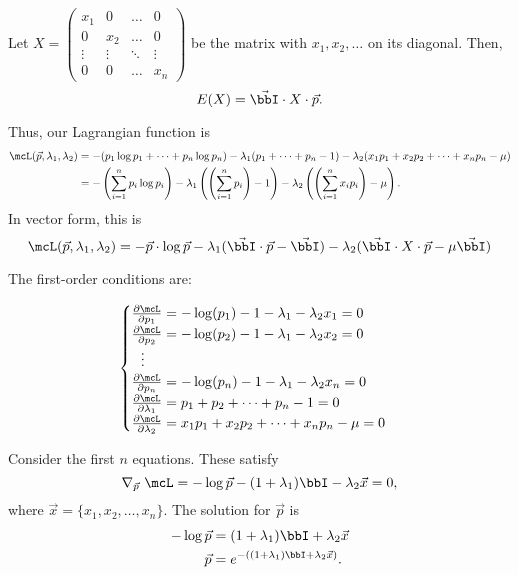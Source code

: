 \documentclass[a4paper, 12pt,oneside,openany]{book}
\begin{document}
Let $X=\begin{pmatrix} x_1 & 0  & \dots & 0 \\ 0 & x_2 & \dots & 0 \\ \vdots & \vdots & \ddots & \vdots \\ 0 & 0 & \dots & x_n \end{pmatrix}$ be the matrix with $x_1, x_2, \dots$ on its diagonal. Then, $$E(X)= \vec{\bbI} \cdot X \cdot \vec{p}.$$

Thus, our Lagrangian function is \begin{align*} \mcL(\vec{p}, \lambda_1, \lambda_2) &= -(p_1\log p_1+\dots + p_n \log p_n) - \lambda_1(p_1+\dots+p_n-1) - \lambda_2(x_1p_1 + x_2p_2 + \dots + x_np_n-\mu)\\ &= -\left(\sum\limits_{i=1}^n p_i \log p_i\right) - \lambda_1\left(\left(\sum\limits_{i=1}^n p_i\right)-1\right) - \lambda_2\left(\left(\sum\limits_{i=1}^n x_ip_i\right)-\mu\right). \end{align*} In vector form, this is $$\mcL(\vec{p}, \lambda_1, \lambda_2) = -\vec{p} \cdot \log\vec{p} - \lambda_1 (\vec{\bbI}\cdot \vec{p} -\vec{\bbI}) - \lambda_2 (\vec{\bbI} \cdot X \cdot \vec{p}-\mu\vec{\bbI})$$ 

The first-order conditions are:

$$\begin{cases}
	\frac{\partial \mcL}{\partial p_1} = -\log(p_1)-1-\lambda_1-\lambda_2x_1=0 \\
	\frac{\partial \mcL}{\partial p_2} = -\log(p_2)-1-\lambda_1-\lambda_2x_2=0 \\
	\ \ \vdots \\
	\frac{\partial \mcL}{\partial p_n} = -\log(p_n)-1-\lambda_1-\lambda_2x_n=0 \\
	\frac{\partial \mcL}{\partial \lambda_1} = p_1+p_2+\dots+p_n-1=0 \\
	\frac{\partial \mcL}{\partial \lambda_2} = x_1p_1+x_2p_2+\dots+x_np_n-\mu=0
\end{cases}$$

Consider the first $n$ equations. These satisfy $$\nabla_{\vec{p}}\ \mcL = -\log{\vec{p}}-(1+\lambda_1) \bbI - \lambda_2 \vec{x}=0,$$ where $\vec{x} = \{x_1, x_2, \dots, x_n\}$. The solution for $\vec{p}$ is \begin{align*} -\log \vec{p} &= (1+\lambda_1) \bbI + \lambda_2\vec{x} \\ \vec{p} &= e^{-((1+\lambda_1)\bbI + \lambda_2\vec{x})}.\end{align*} 
\end{document}
